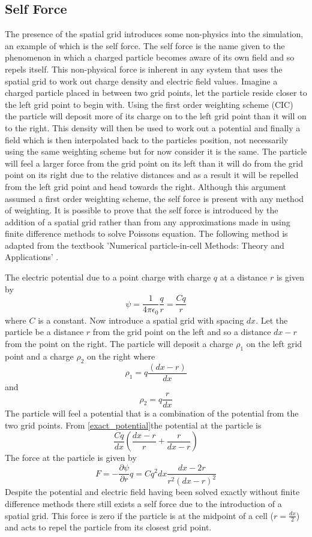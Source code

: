 \documentclass[12pt]{article}
\def\be{\begin{equation}}
\def\ee{\end{equation}}
\begin{document}
\subsection{Self Force}
The presence of the spatial grid introduces some non-physics into the simulation, an example of which is the self force. The self force is the name given to the phenomenon in which a charged particle becomes aware of its own field and so repels itself. This non-physical force is inherent in any system that uses the spatial grid to work out charge density and electric field values. Imagine a charged particle placed in between two grid points, let the particle reside closer to the left grid point to begin with. Using the first order weighting scheme (CIC) the particle will deposit more of its charge on to the left grid point than it will on to the right. This density will then be used to work out a potential and finally a field which is then interpolated back to the particles position, not necessarily using the same weighting scheme but for now consider it is the same. The particle will feel a larger force from the grid point on its left than it will do from the grid point on its right due to the relative distances and as a result it will be repelled from the left grid point and head towards the right. Although this argument assumed a first order weighting scheme, the self force is present with any method of weighting. 
It is possible to prove that the self force is introduced by the addition of a spatial grid rather than from any approximations made in using finite difference methods to solve Poissons equation. The following method is adapted from the textbook 'Numerical particle-in-cell Methods: Theory and Applications' \cite{selfforce}. 

The electric potential due to a point charge with charge $q$ at a distance $r$ is given by 
\be 
\psi = \frac{1}{4 \pi \epsilon_0} \frac{q}{r} = \frac{C q}{r}
\label{exact_potential}
\ee 
where $C$ is a constant. Now introduce a spatial grid with spacing $dx$. Let the particle be a distance $r$ from the grid point on the left and so a distance $dx - r$ from the point on the right. The particle will deposit a charge $\rho_1$ on the left grid point and a charge $\rho_2$ on the right where
\be 
\rho_1 = q\frac{(dx-r)}{dx}
\ee 
and
\be 
\rho_2 = q\frac{r}{dx}
\ee 
The particle will feel a potential that is a combination of the potential from the two grid points. From \eqref{exact_potential}the potential at the particle is 
\be 
\frac{C q}{dx} \left(\frac{dx - r}{r} + \frac{r}{dx - r} \right) 
\ee 
The force at the particle is given by 
\be 
F = -\frac{\partial \psi}{\partial r} q = Cq^2 dx\frac{dx-2r}{r^2(dx-r)^2}
\ee 
Despite the potential and electric field having been solved exactly without finite difference methods there still exists a self force due to the introduction of a spatial grid. This force is zero if the particle is at the midpoint of a cell ($r=\frac{dx}{2}$) and acts to repel the particle from its closest grid point.
\end{document}
